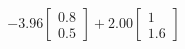 \documentclass[preview]{standalone}
\begin{document}
\begin{align*}
-3.96 \begin{bmatrix} 0.8 \\ 0.5 \end{bmatrix} + 2.00 \begin{bmatrix} 1 \\ 1.6 \end{bmatrix}
\end{align*}
\end{document}
